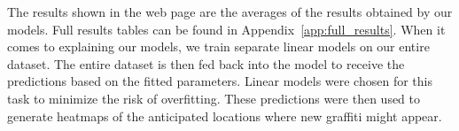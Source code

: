 The results shown in the web page are the averages of the results obtained by our models. Full results tables can be found in Appendix~\ref{app:full_results}. When it comes to explaining our models, we train separate linear models on our entire dataset. The entire dataset is then fed back into the model to receive the predictions based on the fitted parameters. Linear models were chosen for this task to minimize the risk of overfitting. These predictions were then used to generate heatmaps of the anticipated locations where new graffiti might appear.

